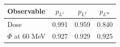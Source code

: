 \begin{tabular}{lccc}
\toprule
Observable & $p_{L^1}$ & $p_{L^2}$ & $p_{L^\infty}$ \\
\midrule
Dose & 0.991 & 0.959 & 0.840 \\
$\Phi$ at 60 MeV & 0.927 & 0.929 & 0.925 \\
\bottomrule
\end{tabular}
